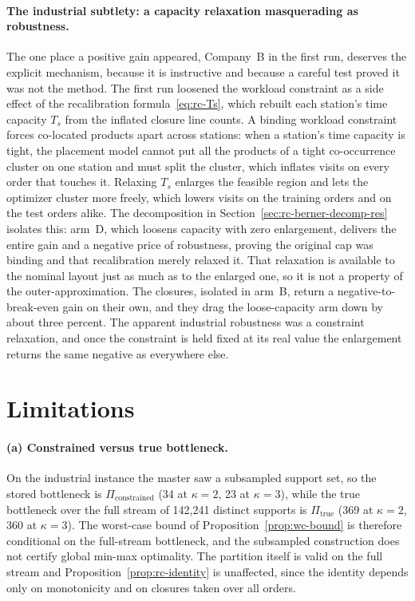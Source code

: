 \documentclass[preprint,review,11pt,authoryear]{elsarticle}
\begin{document}
\paragraph{The industrial subtlety: a capacity relaxation masquerading as robustness.}
The one place a positive gain appeared, Company~B in the first run, deserves the explicit mechanism, because it is instructive and because a careful test proved it was not the method. The first run loosened the workload constraint as a side effect of the recalibration formula~\eqref{eq:rc-Ts}, which rebuilt each station's time capacity $T_s$ from the inflated closure line counts. A binding workload constraint forces co-located products apart across stations: when a station's time capacity is tight, the placement model cannot put all the products of a tight co-occurrence cluster on one station and must split the cluster, which inflates visits on every order that touches it. Relaxing $T_s$ enlarges the feasible region and lets the optimizer cluster more freely, which lowers visits on the training orders and on the test orders alike. The decomposition in Section~\ref{sec:rc-berner-decomp-res} isolates this: arm~D, which loosens capacity with zero enlargement, delivers the entire gain and a negative price of robustness, proving the original cap was binding and that recalibration merely relaxed it. That relaxation is available to the nominal layout just as much as to the enlarged one, so it is not a property of the outer-approximation. The closures, isolated in arm~B, return a negative-to-break-even gain on their own, and they drag the loose-capacity arm down by about three percent. The apparent industrial robustness was a constraint relaxation, and once the constraint is held fixed at its real value the enlargement returns the same negative as everywhere else.

\section{Limitations}\label{sec:rc-limitations}

\paragraph{(a) Constrained versus true bottleneck.}
On the industrial instance the master saw a subsampled support set, so the stored bottleneck is $\Pi_{\text{constrained}}$ (34 at $\kappa=2$, 23 at $\kappa=3$), while the true bottleneck over the full stream of 142{,}241 distinct supports is $\Pi_{\text{true}}$ (369 at $\kappa=2$, 360 at $\kappa=3$). The worst-case bound of Proposition~\ref{prop:wc-bound} is therefore conditional on the full-stream bottleneck, and the subsampled construction does not certify global min-max optimality. The partition itself is valid on the full stream and Proposition~\ref{prop:rc-identity} is unaffected, since the identity depends only on monotonicity and on closures taken over all orders.
\end{document}
